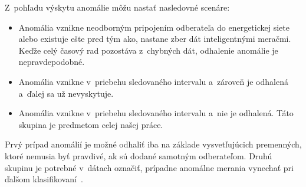 \documentclass[a4paper,twoside,slovak,12pt,appendix]{article}
\begin{document}
Z~pohľadu výskytu anomálie môžu nastať nasledovné scenáre:
\begin{itemize}
  \item Anomália vznikne neodborným pripojením odberateľa do energetickej siete alebo existuje ešte pred tým ako, nastane zber dát inteligentnými meračmi.
        Keďže celý časový rad pozostáva z~chybných dát, odhalenie anomálie je nepravdepodobné.
  \item Anomália vznikne v~priebehu sledovaného intervalu a~zároveň je odhalená a~ďalej sa už nevyskytuje.
  \item Anomália vznikne v~priebehu sledovaného intervalu a~nie je odhalená. Táto skupina je predmetom celej našej práce.
\end{itemize}
Prvý prípad anomálií je možné odhaliť iba na základe vysvetľujúcich premenných,
ktoré nemusia byť pravdivé, ak sú dodané samotným odberateľom. Druhú skupinu je
potrebné v~dátach označiť, prípadne anomálne merania vynechať pri ďalšom
klasifikovaní~\cite{Spiric2015}.

\end{document}
